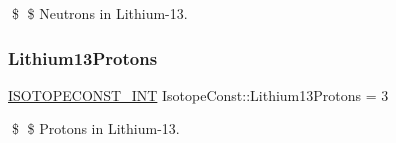 \$ \$ Neutrons in Lithium-\/13. \mbox{\label{group___isotope_const-_lithium-_li13_ga9d116941cec8a1330f91245759304940}} 
\subsubsection{\texorpdfstring{Lithium13\+Protons}{Lithium13Protons}}
{\footnotesize\ttfamily \mbox{\hyperlink{group___isotope_const-_macros_ga5f18360b3e99483a35c32d789e62621c}{I\+S\+O\+T\+O\+P\+E\+C\+O\+N\+S\+T\+\_\+\+I\+NT}} Isotope\+Const\+::\+Lithium13\+Protons = 3}

\$ \$ Protons in Lithium-\/13. 